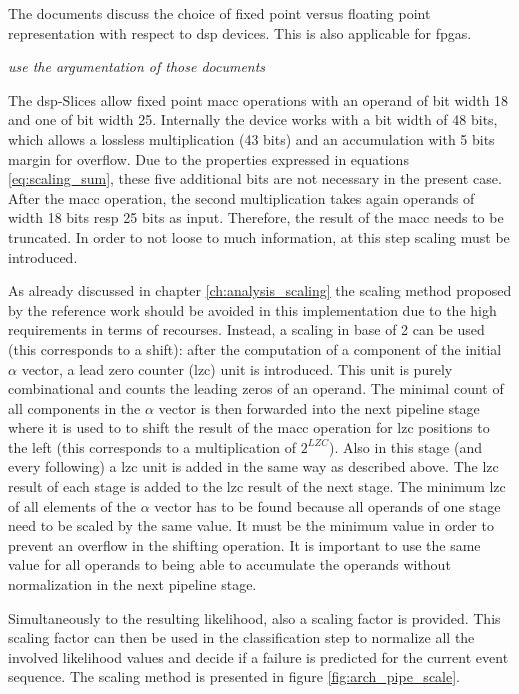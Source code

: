 \documentclass[mscthesis]{usiinfthesis}
\begin{document}
The documents \cite{smith97, ti04} discuss the choice of fixed point versus
floating point representation with respect to \gls{dsp} devices. This is also
applicable for \glspl{fpga}.

\emph{\color{red} use the argumentation of those documents}

The \gls{dsp}-Slices allow fixed point \gls{macc} operations with an operand
of bit width 18 and one of bit width 25. Internally the device works with a bit
width of 48 bits, which allows a lossless multiplication (43 bits) and an
accumulation with 5 bits margin for overflow. Due to the properties expressed in
equations \ref{eq:scaling_sum}, these five additional bits are not necessary in
the present case. After the \gls{macc} operation, the second multiplication takes
again operands of width 18 bits resp 25 bits as input. Therefore, the result of
the \gls{macc} needs to be truncated. In order to not loose to much information, at
this step scaling must be introduced.

As already discussed in chapter \ref{ch:analysis_scaling} the scaling method
proposed by the reference work should be avoided in this implementation due to
the high requirements in terms of recourses. Instead, a scaling in base of
2 can be used (this corresponds to a shift): after the computation of
a component of the initial $\alpha$ vector, a lead zero counter (\gls{lzc})
unit is introduced. This unit is purely combinational and counts the leading
zeros of an operand. The minimal count of all components in the $\alpha$ vector
is then forwarded into the next pipeline stage where it is used to to shift the
result of the \gls{macc} operation for \gls{lzc} positions to the left (this
corresponds to a multiplication of $2^{LZC}$). Also in this stage (and every
following) a \gls{lzc} unit is added in the same way as described above. The
\gls{lzc} result of each stage is added to the \gls{lzc} result of the next
stage. The minimum \gls{lzc} of all elements of the $\alpha$ vector has to be
found because all operands of one stage need to be scaled by the same value. It
must be the minimum value in order to prevent an overflow in the shifting
operation. It is important to use the same value for all operands to being able
to accumulate the operands without normalization in the next pipeline stage.

Simultaneously to the resulting likelihood, also a scaling factor is provided.
This scaling factor can then be used in the classification step to normalize
all the involved likelihood values and decide if a failure is predicted for the
current event sequence. The scaling method is presented in figure
\ref{fig:arch_pipe_scale}.
\end{document}

